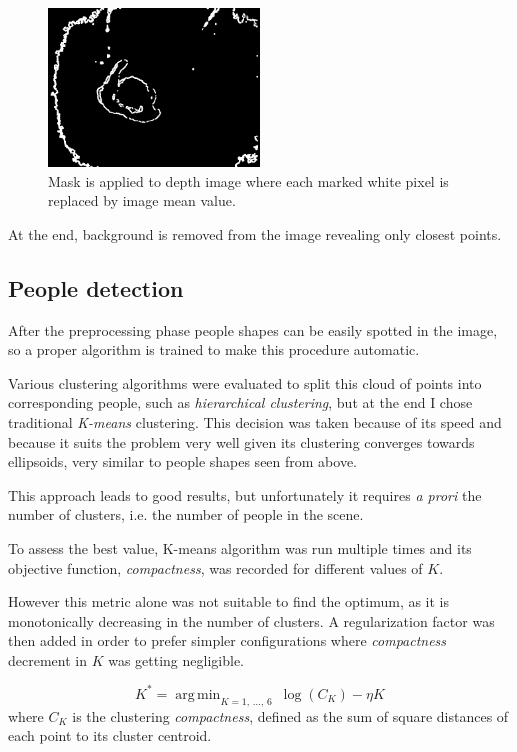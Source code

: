 \documentclass[a4paper]{article}
\DeclareMathOperator*{\argmin}{arg\,min}
\begin{document}
\begin{figure}[htp]
  \centering
  \vspace{-0.5cm}\includegraphics[width=0.5\textwidth]{results/border_mask.png}
  \caption{Mask is applied to depth image where each marked white pixel is replaced by image mean value.}
  \label{fig:border_mask}
\end{figure}

At the end, background is removed from the image revealing only closest points.

\subsection*{People detection}
After the preprocessing phase people shapes can be easily spotted in the image, so a proper algorithm is trained to make this procedure automatic.

Various clustering algorithms were evaluated to split this cloud of points into corresponding people, such as \emph{hierarchical clustering}, but at the end I chose traditional \emph{K-means} clustering.
This decision was taken because of its speed and because it suits the problem very well given its clustering converges towards ellipsoids, very similar to people shapes seen from above.

This approach leads to good results, but unfortunately it requires \emph{a prori} the number of clusters, i.e. the number of people in the scene.

To assess the best value, K-means algorithm was run multiple times and its objective function, \emph{compactness}, was recorded for different values of $K$.

However this metric alone was not suitable to find the optimum, as it is monotonically decreasing in the number of clusters.
A regularization factor was then added in order to prefer simpler configurations where \emph{compactness} decrement in $K$ was getting negligible.

\begin{equation*}
  K^* = \argmin_{K = 1,\, \ldots,\, 6} ~  \log(C_K) - \eta K
\end{equation*}
where $C_K$ is the clustering \emph{compactness}, defined as the sum of square distances of each point to its cluster centroid.
\end{document}
